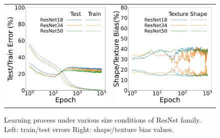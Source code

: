 \begin{figure}[htb]
\centering
   \begin{tabular}{cc}
      \includegraphics[keepaspectratio, width=0.45\linewidth]{fig/model_learning_curv.pdf} &
       \hspace{5pt} 
      \includegraphics[keepaspectratio, width=0.45\linewidth]{fig/model_sha_tex.pdf}
   \end{tabular}
\caption[Learning process under various size conditions of ResNet family.]{
Learning process under various size conditions of ResNet family. Left: train/test errors Right: shape/texture bias values.}
\label{fig:comp_model}
\end{figure}

